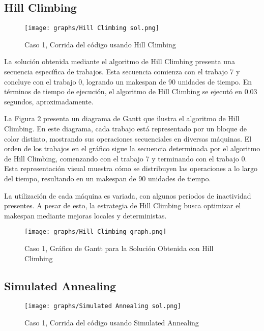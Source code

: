 \documentclass[11pt]{article}
\begin{document}
\subsection{Hill Climbing}

\begin{figure}[H]
  \centering
  \texttt{[image: graphs/Hill Climbing sol.png]}
  \caption{Caso 1, Corrida del código usando Hill Climbing}
  \label{fig:miImagen}
\end{figure}

\noindent La solución obtenida mediante el algoritmo de Hill Climbing presenta una secuencia específica de trabajos. Esta secuencia comienza con el trabajo 7 y concluye con el trabajo 0, logrando un makespan de 90 unidades de tiempo. En términos de tiempo de ejecución, el algoritmo de Hill Climbing se ejecutó en 0.03 segundos, aproximadamente.

\vspace{1em} %
\noindent La Figura 2 presenta un diagrama de Gantt que ilustra el algoritmo de Hill Climbing. En este diagrama, cada trabajo está representado por un bloque de color distinto, mostrando sus operaciones secuenciales en diversas máquinas. El orden de los trabajos en el gráfico sigue la secuencia determinada por el algoritmo de Hill Climbing, comenzando con el trabajo 7 y terminando con el trabajo 0. Esta representación visual muestra cómo se distribuyen las operaciones a lo largo del tiempo, resultando en un makespan de 90 unidades de tiempo.

\noindent La utilización de cada máquina es variada, con algunos periodos de inactividad presentes. A pesar de esto, la estrategia de Hill Climbing busca optimizar el makespan mediante mejoras locales y deterministas. 

\begin{figure}[H]
\centering
\texttt{[image: graphs/Hill Climbing graph.png]}
\caption{Caso 1, Gráfico de Gantt para la Solución Obtenida con Hill Climbing}
\label{fig:miImagen}
\end{figure}

\subsection{Simulated Annealing} 

\begin{figure}[H]
  \centering
  \texttt{[image: graphs/Simulated Annealing sol.png]}
\caption{Caso 1, Corrida del código usando Simulated Annealing}
  \label{fig:miImagen}
\end{figure}
\end{document}
